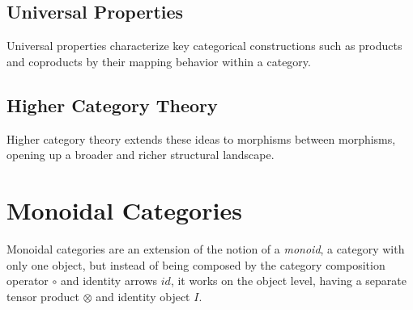 \subsection{Universal Properties}
Universal properties characterize key categorical constructions such as products
and coproducts by their mapping behavior within a category.
\begin{definition}[Cone]
\end{definition}
\begin{definition}[Limit]
\end{definition}
\begin{definition}[Co-limit]
\end{definition}
\subsection{Higher Category Theory}
Higher category theory extends these ideas to morphisms between morphisms,
opening up a broader and richer structural landscape.
\begin{definition}[Groupoid]
\end{definition}
\begin{definition}[$n$-Category]
\end{definition}
\begin{definition}
\end{definition}
\begin{definition}
\end{definition}
\section{Monoidal Categories}
Monoidal categories are an extension of the notion of a \emph{monoid}, a
category with only one object, but instead of being composed by the category
composition operator $\circ$ and identity arrows $id$, it works on the object
level, having a separate tensor product $\otimes$ and identity object $I$.


\begin{definition}
\end{definition}
